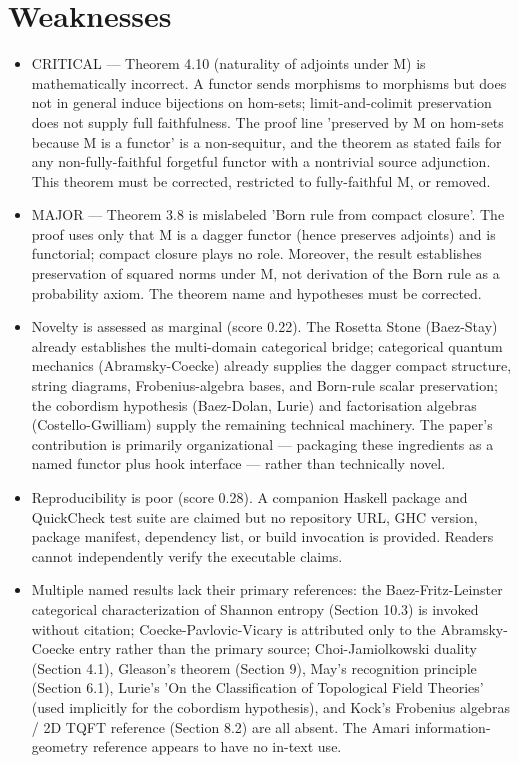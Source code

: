 \documentclass[11pt]{article}
\begin{document}
\section*{Weaknesses}
\begin{itemize}[leftmargin=*]
  \item CRITICAL — Theorem 4.10 (naturality of adjoints under M) is mathematically incorrect. A functor sends morphisms to morphisms but does not in general induce bijections on hom-sets; limit-and-colimit preservation does not supply full faithfulness. The proof line 'preserved by M on hom-sets because M is a functor' is a non-sequitur, and the theorem as stated fails for any non-fully-faithful forgetful functor with a nontrivial source adjunction. This theorem must be corrected, restricted to fully-faithful M, or removed.
  \item MAJOR — Theorem 3.8 is mislabeled 'Born rule from compact closure'. The proof uses only that M is a dagger functor (hence preserves adjoints) and is functorial; compact closure plays no role. Moreover, the result establishes preservation of squared norms under M, not derivation of the Born rule as a probability axiom. The theorem name and hypotheses must be corrected.
  \item Novelty is assessed as marginal (score 0.22). The Rosetta Stone (Baez-Stay) already establishes the multi-domain categorical bridge; categorical quantum mechanics (Abramsky-Coecke) already supplies the dagger compact structure, string diagrams, Frobenius-algebra bases, and Born-rule scalar preservation; the cobordism hypothesis (Baez-Dolan, Lurie) and factorisation algebras (Costello-Gwilliam) supply the remaining technical machinery. The paper's contribution is primarily organizational — packaging these ingredients as a named functor plus hook interface — rather than technically novel.
  \item Reproducibility is poor (score 0.28). A companion Haskell package and QuickCheck test suite are claimed but no repository URL, GHC version, package manifest, dependency list, or build invocation is provided. Readers cannot independently verify the executable claims.
  \item Multiple named results lack their primary references: the Baez-Fritz-Leinster categorical characterization of Shannon entropy (Section 10.3) is invoked without citation; Coecke-Pavlovic-Vicary is attributed only to the Abramsky-Coecke entry rather than the primary source; Choi-Jamiolkowski duality (Section 4.1), Gleason's theorem (Section 9), May's recognition principle (Section 6.1), Lurie's 'On the Classification of Topological Field Theories' (used implicitly for the cobordism hypothesis), and Kock's Frobenius algebras / 2D TQFT reference (Section 8.2) are all absent. The Amari information-geometry reference appears to have no in-text use.

\end{itemize}
\end{document}

